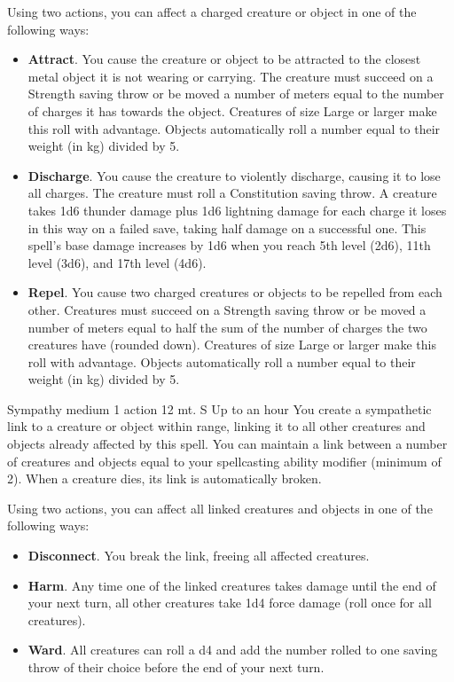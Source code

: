         Using two actions, you can affect a charged creature or object in one of the following ways:
        \begin{itemize}
            \item \textbf{Attract}.
            You cause the creature or object to be attracted to the closest metal object it is not wearing or carrying.
            The creature must succeed on a Strength saving throw or be moved a number of meters equal to the number of charges it has towards the object.
            Creatures of size Large or larger make this roll with advantage.
            Objects automatically roll a number equal to their weight (in kg) divided by 5.
            \item \textbf{Discharge}.
            You cause the creature to violently discharge, causing it to lose all charges.
            The creature must roll a Constitution saving throw.
            A creature takes 1d6 thunder damage plus 1d6 lightning damage for each charge it loses in this way on a failed save, taking half damage on a successful one.
            This spell's base damage increases by 1d6 when you reach 5th level (2d6), 11th level (3d6), and 17th level (4d6).
            \item \textbf{Repel}.
            You cause two charged creatures or objects to be repelled from each other.
            Creatures must succeed on a Strength saving throw or be moved a number of meters equal to half the sum of the number of charges the two creatures have (rounded down).
            Creatures of size Large or larger make this roll with advantage.
            Objects automatically roll a number equal to their weight (in kg) divided by 5.
        \end{itemize}
        {Sympathy medium}
        {1 action}
        {12 mt.}
        {S}
        {Up to an hour}
        You create a sympathetic link to a creature or object within range, linking it to all other creatures and objects already affected by this spell.
        You can maintain a link between a number of creatures and objects equal to your spellcasting ability modifier (minimum of 2).
        When a creature dies, its link is automatically broken.

        Using two actions, you can affect all linked creatures and objects in one of the following ways:
        \begin{itemize}
            \item \textbf{Disconnect}.
            You break the link, freeing all affected creatures.
            \item \textbf{Harm}.
            Any time one of the linked creatures takes damage until the end of your next turn, all other creatures take 1d4 force damage (roll once for all creatures).
            \item \textbf{Ward}.
            All creatures can roll a d4 and add the number rolled to one saving throw of their choice before the end of your next turn.
        \end{itemize}
